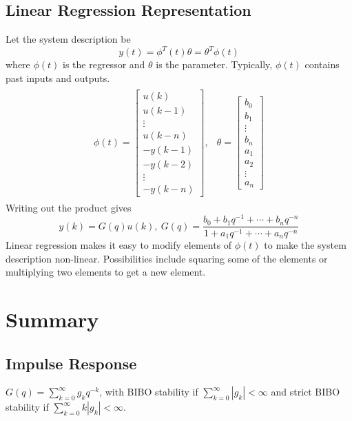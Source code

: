 \documentclass[lecture,12pt,]{pcms-l}
\begin{document}
\subsection{Linear Regression Representation}
Let the system description be
$$y(t)=\phi^T(t)\theta = \theta^T\phi(t)$$
where $\phi(t)$ is the regressor and $\theta$ is the parameter. Typically, $\phi(t)$ contains past inputs and outputs.
\begin{align*}
\begin{split}
\phi(t) = \left[\begin{array}{c}
			u(k) \\
			u(k-1) \\
			\vdots \\
			u(k-n) \\
			-y(k-1) \\
			-y(k-2) \\
			\vdots \\
			-y(k-n)
		\end{array}\right],
\end{split}
\begin{split}
\theta = \left[\begin{array}{c}
			b_0 \\
			b_1 \\
			\vdots \\
			b_n \\
			a_1 \\
			a_2 \\
			\vdots \\
			a_n
		\end{array}\right]
\end{split}
\end{align*}
Writing out the product gives
$$y(k) = G(q)u(k), ~ G(q) = \frac{b_0+b_1q^{-1}+\cdots+b_nq^{-n}}{1+a_1q^{-1}+\cdots+a_nq^{-n}}$$
Linear regression makes it easy to modify elements of $\phi(t)$ to make the system description non-linear. Possibilities include squaring some of the elements or multiplying two elements to get a new element.

\section{Summary}
\subsection{Impulse Response}
$G(q) = \sum_{k=0}^\infty g_kq^{-k}$, with BIBO stability if $\sum_{k=0}^\infty |g_k| < \infty$ and strict BIBO stability if $\sum_{k=0}^\infty k|g_k| < \infty$.
\end{document}
